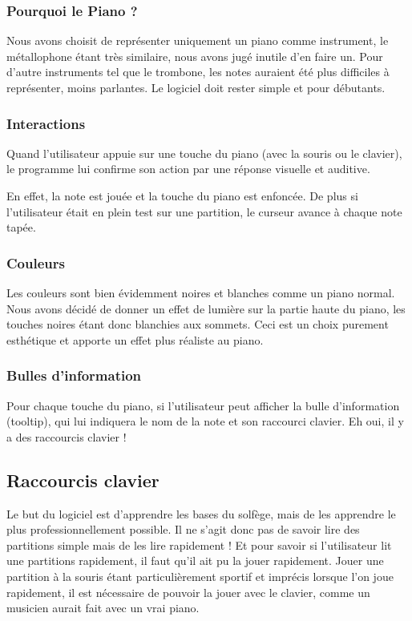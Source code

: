 \documentclass{article}
\begin{document}
\subsubsection{Pourquoi le Piano ?}
Nous avons choisit de représenter uniquement un piano comme instrument, le métallophone étant très similaire, nous avons
jugé inutile d'en faire un. Pour d'autre instruments tel que le trombone, les notes auraient été plus difficiles à représenter,
moins parlantes. Le logiciel doit rester simple et pour débutants.
\subsubsection{Interactions}
Quand l'utilisateur appuie sur une touche du piano (avec la souris ou le clavier),
le programme lui confirme son action par une réponse visuelle et auditive.


En effet, la note est jouée et la touche du piano est enfoncée. De plus si l'utilisateur était en plein test sur une partition,
le curseur avance à chaque note tapée.
\subsubsection{Couleurs}
Les couleurs sont bien évidemment noires et blanches comme un piano normal. Nous avons décidé de donner un effet de lumière 
sur la partie haute du piano, les touches noires étant donc blanchies aux sommets. Ceci est un choix purement esthétique et 
apporte un effet plus réaliste au piano.
\subsubsection{Bulles d'information}
Pour chaque touche du piano, si l'utilisateur peut afficher la bulle d'information (tooltip), qui lui indiquera le nom de la 
note et son raccourci clavier. Eh oui, il y a des raccourcis clavier !
\subsection{Raccourcis clavier}
Le but du logiciel est d'apprendre les bases du solfège, mais de les apprendre le plus professionnellement possible.
Il ne s’agit donc pas de savoir lire des partitions simple mais de les lire rapidement !
Et pour savoir si l'utilisateur lit une partitions rapidement, il faut qu'il ait pu la jouer rapidement.
Jouer une partition à la souris étant particulièrement sportif et imprécis lorsque l'on joue rapidement, il est nécessaire
de pouvoir la jouer avec le clavier, comme un musicien aurait fait avec un vrai piano.
\end{document}
